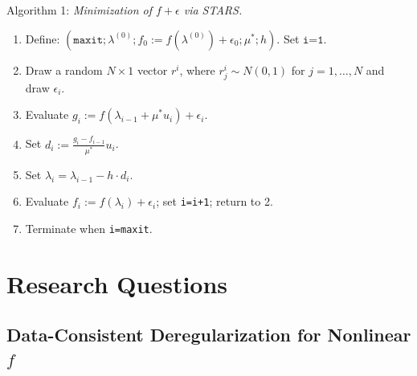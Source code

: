 \documentclass[11pt]{beamer}
\newcommand{\ds}{\displaystyle}
\begin{document}
\begin{frame}

\begin{block}{Algorithm 1: \textit{Minimization of $f+\epsilon$ via STARS\footnotemark[1].}}



\begin{enumerate}[1:]

\item Define: $\left(\texttt{maxit}; \lambda^{(0)}; f_0:=f(\lambda^{(0)})+\epsilon_0; \mu^*; h\right)$. Set $\texttt{i=1}$.


\item Draw a random $N \times 1$ vector $r^i$, where $r^i_j \sim N(0,1)$ for $j=1,\ldots,N$ and draw $\epsilon_i$.

\item Evaluate $g_i:=f(\lambda_{i-1}+\mu^*u_i)+\epsilon_i$.

\item Set $\ds d_i:=\frac{g_i-f_{i-1}}{\mu^*}u_i$.

\item Set $\lambda_i=\lambda_{i-1}-h\cdot d_i$.

\item Evaluate $f_i:=f(\lambda_i)+\epsilon_i$; set \texttt{i=i+1}; return to 2.

\item Terminate when \texttt{i=maxit}.

\end{enumerate}



\end{block}



\end{frame}




\section{Research Questions}


\subsection{Data-Consistent Deregularization for Nonlinear $f$}
\end{document}
